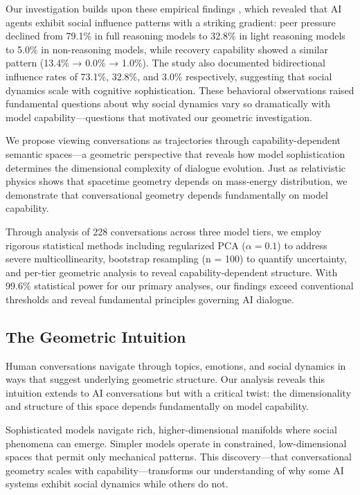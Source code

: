 \documentclass[11pt,letterpaper]{article}
\newcommand{\totalConversations}{228}
\newcommand{\powerOutcomeGroups}{99.6\%}
\newcommand{\regularizationAlpha}{0.1}
\newcommand{\bootstrapSamples}{100}
\newcommand{\fullReasoningPeerPressure}{79.1\%}
\newcommand{\lightReasoningPeerPressure}{32.8\%}
\newcommand{\nonReasoningPeerPressure}{5.0\%}
\newcommand{\fullReasoningRecovery}{13.4\%}
\newcommand{\lightReasoningRecovery}{0.0\%}
\newcommand{\nonReasoningRecovery}{1.0\%}
\newcommand{\fullBidirectional}{73.1\%}
\newcommand{\lightBidirectional}{32.8\%}
\newcommand{\nonBidirectional}{3.0\%}
\begin{document}
Our investigation builds upon these empirical findings \citep{garcia2025peer}, which revealed that AI agents exhibit social influence patterns with a striking gradient: peer pressure declined from \fullReasoningPeerPressure{} in full reasoning models to \lightReasoningPeerPressure{} in light reasoning models to \nonReasoningPeerPressure{} in non-reasoning models, while recovery capability showed a similar pattern (\fullReasoningRecovery{} → \lightReasoningRecovery{} → \nonReasoningRecovery{}). The study also documented bidirectional influence rates of \fullBidirectional{}, \lightBidirectional{}, and \nonBidirectional{} respectively, suggesting that social dynamics scale with cognitive sophistication. These behavioral observations raised fundamental questions about why social dynamics vary so dramatically with model capability—questions that motivated our geometric investigation.

We propose viewing conversations as trajectories through capability-dependent semantic spaces—a geometric perspective that reveals how model sophistication determines the dimensional complexity of dialogue evolution. Just as relativistic physics shows that spacetime geometry depends on mass-energy distribution, we demonstrate that conversational geometry depends fundamentally on model capability.

Through analysis of \totalConversations{} conversations across three model tiers, we employ rigorous statistical methods including regularized PCA ($\alpha = \regularizationAlpha{}$) to address severe multicollinearity, bootstrap resampling (n = \bootstrapSamples{}) to quantify uncertainty, and per-tier geometric analysis to reveal capability-dependent structure. With \powerOutcomeGroups{} statistical power for our primary analyses, our findings exceed conventional thresholds and reveal fundamental principles governing AI dialogue.

\subsection{The Geometric Intuition}

Human conversations navigate through topics, emotions, and social dynamics in ways that suggest underlying geometric structure. Our analysis reveals this intuition extends to AI conversations but with a critical twist: the dimensionality and structure of this space depends fundamentally on model capability.

Sophisticated models navigate rich, higher-dimensional manifolds where social phenomena can emerge. Simpler models operate in constrained, low-dimensional spaces that permit only mechanical patterns. This discovery—that conversational geometry scales with capability—transforms our understanding of why some AI systems exhibit social dynamics while others do not.
\end{document}
